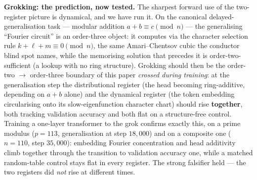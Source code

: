 \documentclass[
  letterpaper,
  11pt]{article}
\theoremstyle{plain}
\theoremstyle{definition}
\theoremstyle{remark}
\begin{document}
\textbf{Grokking: the prediction, now tested.} The sharpest forward use of the two-register picture is dynamical, and we have run it. On the canonical delayed-generalisation task --- modular addition \(a+b\equiv c \pmod n\) --- the generalising ``Fourier circuit'' is an order-three object: it computes via the character selection rule \(k+\ell+m\equiv 0\pmod n\), the same Amari--Chentsov cubic the conductor blind spot names, while the memorising solution that precedes it is order-two-sufficient (a lookup with no ring structure). Grokking should then be the order-two \(\to\) order-three boundary of this paper \emph{crossed during training}: at the generalisation step the distributional register (the head becoming ring-additive, depending on \(a+b\) alone) and the dynamical register (the token embedding circularising onto its slow-eigenfunction character chart) should rise \textbf{together}, both tracking validation accuracy and both flat on a structure-free control. Training a one-layer transformer to the grok confirms exactly this, on a prime modulus (\(p=113\), generalisation at step \(18{,}000\)) and on a composite one (\(n=110\), step \(35{,}000\)): embedding Fourier concentration and head additivity climb together through the transition to validation accuracy one, while a matched random-table control stays flat in every register. The strong falsifier held --- the two registers did \emph{not} rise at different times.
\end{document}

